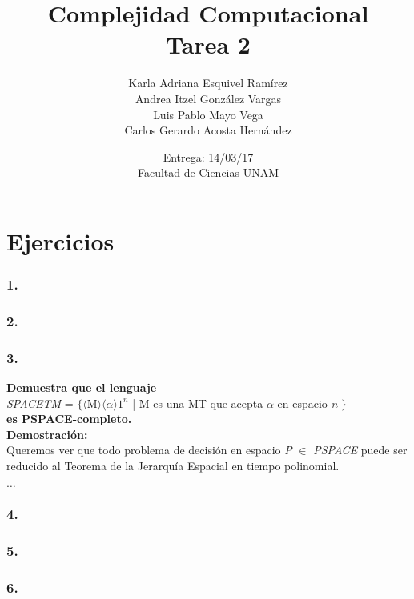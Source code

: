 \documentclass[12pt]{article}
\title{Complejidad Computacional \\ Tarea 2}
\author{Karla Adriana Esquivel Ramírez \\ Andrea Itzel González Vargas\\ Luis Pablo Mayo Vega \\ Carlos Gerardo Acosta Hernández}
\date{Entrega: 14/03/17 \\ Facultad de Ciencias UNAM}
\begin{document}
\maketitle
\section*{Ejercicios}

\subsubsection*{1.}

\subsubsection*{2.}

\subsubsection*{3.}
\textbf{Demuestra que el lenguaje} \\
\indent \textit{SPACETM} = $\{ \langle$M$\rangle \langle \alpha 
\rangle 1^n$ | M es una MT que acepta $\alpha$ en espacio \textit{n} $\}$ \\
\textbf{es PSPACE-completo.} \\

\noindent \textbf{Demostración: \\}
Queremos ver que todo problema de decisión en espacio \textit{P} $\in$ \textit{PSPACE} puede ser reducido al Teorema de la Jerarquía Espacial en tiempo polinomial.

$\dots$

\subsubsection*{4.}

\subsubsection*{5.}

\subsubsection*{6.}
\end{document}
